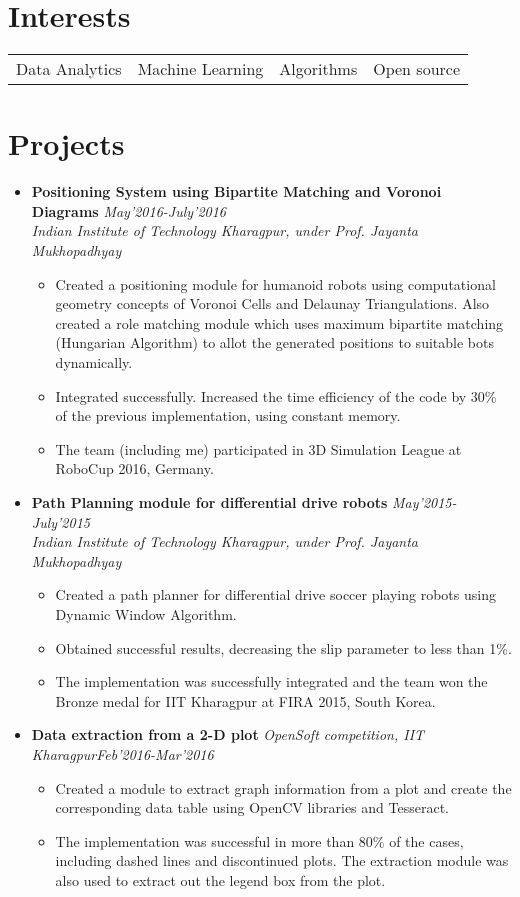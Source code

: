 \documentclass[11pt,a4paper]{moderncv}
\newcommand{\experience}[4]{
  \vspace{0.1cm}
\item \textbf{\large{#1}} \textit{#2}\hfill\textit{#3}
  \begin{itemize}[leftmargin=*]
    \setlength\itemsep{0em} #4
  \end{itemize}
}
\newcommand{\experiencetwo}[4]{
  \vspace{0.1cm}
\item \textbf{\large{#1}} \hfill\textit{#3}\\\textit{#2}
  \begin{itemize}[leftmargin=*]
    \setlength\itemsep{0em} #4
  \end{itemize}
}
\begin{document}
\section*{Interests}
\begin{tabular}{L{4cm} L{4cm} L{3.4cm} l}
 Data Analytics & Machine Learning & Algorithms & Open source \\
\end{tabular}

\vspace{-0.1cm}
\section*{Projects}
\begin{itemize}
  \setlength\itemsep{0.5em}

  \experiencetwo{Positioning System using Bipartite Matching and Voronoi Diagrams}{Indian Institute of Technology Kharagpur, under Prof. Jayanta Mukhopadhyay}{May'2016-July'2016}{
   \item Created a positioning module for humanoid robots using computational geometry concepts of Voronoi Cells and Delaunay Triangulations. Also created a role matching module which uses maximum bipartite matching (Hungarian Algorithm) to allot the generated positions to suitable bots dynamically.  
  \item Integrated successfully. Increased the time efficiency of the code
    by 30\% of the previous implementation, using constant memory. 
  \item The team (including me) participated in 3D Simulation League at RoboCup 2016, Germany.
  }
  
  \experiencetwo{Path Planning module for differential drive robots}{Indian Institute of Technology Kharagpur, under Prof. Jayanta Mukhopadhyay}{May'2015-July'2015}{
  \item Created a path planner for differential drive soccer playing robots 
    using Dynamic Window Algorithm.
  \item Obtained successful results, decreasing the slip parameter to less
    than 1\%.  
  \item The implementation was successfully integrated and the team won the 
    Bronze medal for IIT Kharagpur at FIRA 2015, South Korea.
  }

  \experience{Data extraction from a 2-D plot}{OpenSoft competition, IIT Kharagpur}{Feb'2016-Mar'2016}{
  \item Created a module to extract graph information from a plot and create the corresponding data table using OpenCV libraries and Tesseract.
  \item The implementation was successful in more than 80\% of the cases, including dashed lines and discontinued plots. The extraction module was also used to extract out the legend box from the plot.
  }


\end{itemize}
\end{document}
